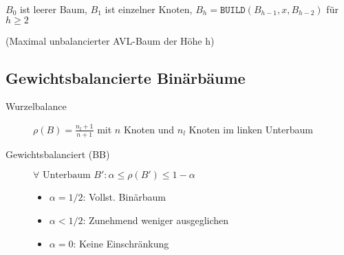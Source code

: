 $B_0$ ist leerer Baum, $B_1$ ist einzelner Knoten, $B_h = \texttt{BUILD}(B_{h-1}, x, B_{h-2})$ für $h \geq 2$

(Maximal unbalancierter AVL-Baum der Höhe h)

\subsection{Gewichtsbalancierte Binärbäume}

\begin{description}
  \item[Wurzelbalance]
    $\rho (B) = \frac{n_l + 1}{n + 1}$ mit $n$ Knoten und $n_l$ Knoten im linken Unterbaum

  \item [Gewichtsbalanciert (BB)] $\forall \text{ Unterbaum } B': \alpha \leq \rho(B') \leq 1 - \alpha$

        \begin{itemize}
          \item $\alpha = 1/2$: Vollst. Binärbaum
          \item $\alpha < 1/2$: Zunehmend weniger ausgeglichen
          \item $\alpha = 0$: Keine Einschränkung
        \end{itemize}
\end{description}


